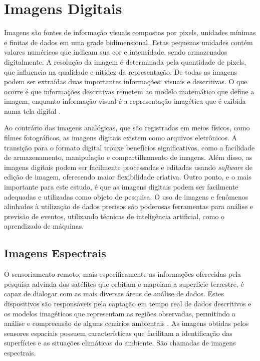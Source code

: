 \documentclass[tcc2]{uftex}
\begin{document}
\section{Imagens Digitais}

Imagens são fontes de informação visuais compostas por pixels, unidades mínimas e finitas de dados em uma grade bidimensional. Estas pequenas unidades contém valores numéricos que indicam sua cor e intensidade, sendo armazenados digitalmente. A resolução da imagem é determinada pela quantidade de pixels, que influencia na qualidade e nitidez da representação. De todas as imagens podem ser extraídas duas importantes informações: visuais e descritivas. O que ocorre é que informações descritivas remetem ao modelo matemático que define a imagem, enquanto informação visual é a representação imagética que é exibida numa tela digital \cite{scuri02}.

Ao contrário das imagens analógicas, que são registradas em meios físicos, como filmes fotográficos, as imagens digitais existem como arquivos eletrônicos. A transição para o formato digital trouxe benefícios significativos, como a facilidade de armazenamento, manipulação e compartilhamento de imagens. Além disso, as imagens digitais podem ser facilmente processadas e editadas usando \textit{software} de edição de imagem, oferecendo maior flexibilidade criativa. Outro ponto, e o mais importante para este estudo, é que as imagens digitais podem ser facilmente adequadas e utilizadas como objeto de pesquisa. O uso de imagens e fenômenos alinhados à utilização de dados precisos são poderosas ferramentas para análise e previsão de eventos, utilizando técnicas de inteligência artificial, como o aprendizado de máquinas.

\subsection{Imagens Espectrais}

O sensoriamento remoto, mais especificamente as informações oferecidas pela pesquisa advinda dos satélites que orbitam e mapeiam a superfície terrestre, é capaz de dialogar com as mais diversas áreas de análise de dados. Estes dispositivos são responsáveis pela captação em tempo real de dados descritivos e os modelos imagéticos que representam as regiões observadas, permitindo a análise e compreensão de alguns cenários ambientais \cite{fitz20}. As imagens obtidas pelos sensores espaciais possuem características que facilitam a identificação das superfícies e as situações climáticas do ambiente. São chamadas de imagens espectrais.
\end{document}
